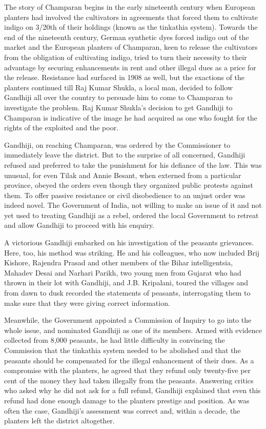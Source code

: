 \begin{multicols}{2}
The story of Champaran begins in the early nineteenth century when European planters had involved the cultivators in agreements that forced them to cultivate indigo on 3/20th of their holdings (known as the tinkathia system). Towards the end of the nineteenth century, German synthetic dyes forced indigo out of the market and the European planters of Champaran, keen to release the cultivators from the obligation of cultivating indigo, tried to turn their necessity to their advantage by securing enhancements in rent and other illegal dues as a price for the release. Resistance had surfaced in 1908 as well, but the exactions of the planters continued till Raj Kumar Shukla, a local man, decided to follow Gandhiji all over the country to persuade him to come to Champaran to investigate the problem. Raj Kumar Shukla's decision to get Gandhiji to Champaran is indicative of the image he had acquired as one who fought for the rights of the exploited and the poor.

Gandhiji, on reaching Champaran, was ordered by the Commissioner to immediately leave the district. But to the surprise of all concerned, Gandhiji refused and preferred to take the punishment for his defiance of the law. This was unusual, for even Tilak and Annie Besant, when externed from a particular province, obeyed the orders even though they organized public protests against them. To offer passive resistance or civil disobedience to an unjust order was indeed novel. The Government of India, not willing to make an issue of it and not yet used to treating Gandhiji as a rebel, ordered the local Government to retreat and allow Gandhiji to proceed with his enquiry.

A victorious Gandhiji embarked on his investigation of the peasants grievances. Here, too, his method was striking. He and his colleagues, who now included Brij Kishore, Rajendra Prasad and other members of the Bihar intelligentsia, Mahadev Desai and Narhari Parikh, two young men from Gujarat who had thrown in their lot with Gandhiji, and J.B. Kripalani, toured the villages and from dawn to dusk recorded the statements of peasants, interrogating them to make sure that they were giving correct information.

Meanwhile, the Government appointed a Commission of Inquiry to go into the whole issue, and nominated Gandhiji as one of its members. Armed with evidence collected from 8,000 peasants, he had little difficulty in convincing the Commission that the tinkathia system needed to be abolished and that the peasants should be compensated for the illegal enhancement of their dues. As a compromise with the planters, he agreed that they refund only twenty-five per cent of the money they had taken illegally from the peasants. Answering critics who asked why he did not ask for a full refund, Gandhiji explained that even this refund had done enough damage to the planters prestige and position. As was often the case, Gandhiji's assessment was correct and, within a decade, the planters left the district altogether.


\end{multicols}

